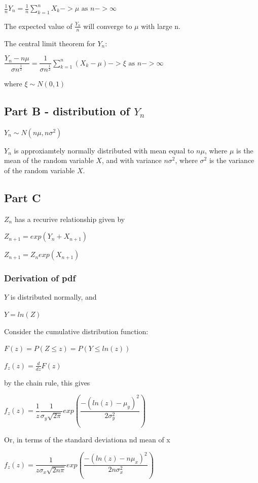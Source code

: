 \documentclass{article}
\begin{document}
$\frac{1}{n}Y_n = \frac{1}{n}\sum\limits_{k=1}^n X_k -> \mu \text{ as } n -> \infty$

The expected value of $\frac{Y_n}{n}$ will converge to $\mu$ with large n.

\bigskip
The central limit theorem for $Y_n$:

$\dfrac{Y_n - n\mu}{\sigma n^\frac{1}{2}} = \dfrac{1}{\sigma n^\frac{1}{2}}\sum\limits_{k=1}^n (X_k - \mu) -> \xi \text{ as } n -> \infty$

where $\xi \sim N(0,1)$

\subsection{Part B - distribution of $Y_n$}

$Y_n \sim N(n\mu, n\sigma^2)$

$Y_n$ is approxiamtely normally distributed with mean equal to $n\mu$, where $\mu$ is the mean of the random variable $X$, and with variance $n\sigma^2$, where $\sigma^2$ is the variance of the random variable $X$. 

\subsection{Part C}

$Z_n$ has a recurive relationship given by

$Z_{n+1} = exp(Y_n + X_{n+1})$

$Z_{n+1} = Z_n exp(X_{n+1})$

\subsubsection{Derivation of pdf}

$Y$ is distributed normally, and

$Y = ln(Z)$

\bigskip

Consider the cumulative distribution function:


$F(z) = P(Z \leq z) = P(Y \leq ln(z))$

$f_z(z) = \frac{d}{dz}F(z)$

by the chain rule, this gives

$f_z(z) = \dfrac{1}{z} \dfrac{1}{\sigma_y \sqrt{2\pi}}exp(\dfrac{-(ln(z)-\mu_y)^2}{2\sigma_y^2})$

Or, in terms of the standard deviationa nd mean of x

$f_z(z) = \dfrac{1}{z\sigma_x \sqrt{2n\pi}}exp(\dfrac{-(ln(z)-n\mu_x)^2}{2n\sigma_x^2})$
\end{document}
